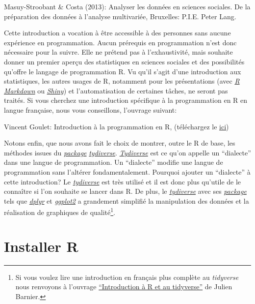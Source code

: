 \documentclass[
]{book}
\begin{document}
Masuy-Stroobant \& Costa (2013): Analyser les données en sciences sociales. De la préparation des données à l'analyse multivariée, Bruxelles: P.I.E. Peter Lang.

Cette introduction a vocation à être accessible à des personnes sans aucune expérience en programmation. Aucun prérequis en programmation n'est donc nécessaire pour la suivre. Elle ne prétend pas à l'exhaustivité, mais souhaite donner un premier aperçu des statistiques en sciences sociales et des possibilités qu'offre le langage de programmation R. Vu qu'il s'agit d'une introduction aux statistiques, les autres usages de R, notamment pour les présentations (avec \href{https://rmarkdown.rstudio.com/}{\emph{R Markdown}} ou \href{https://shiny.rstudio.com/}{\emph{Shiny}}) et l'automatisation de certaines tâches, ne seront pas traités. Si vous cherchez une introduction spécifique à la programmation en R en langue française, nous vous conseillons, l'ouvrage suivant:

Vincent Goulet: Introduction à la programmation en R, (téléchargez le \href{https://cran.r-project.org/doc/contrib/Goulet_introduction_programmation_R.pdf}{ici})

Notons enfin, que nous avons fait le choix de montrer, outre le R de base, les méthodes issues du \protect\hyperlink{packages}{\emph{package}} \href{https://www.tidyverse.org/}{\emph{tydiverse}}. \href{https://www.tidyverse.org/}{\emph{Tydiverse}} est ce qu'on appelle un ``dialecte'' dans une langue de programmation. Un ``dialecte'' modifie une langue de programmation sans l'altérer fondamentalement. Pourquoi ajouter un ``dialecte'' à cette introduction? Le \href{https://www.tidyverse.org/}{\emph{tydiverse}} est très utilisé et il est donc plus qu'utile de le connaître si l'on souhaite se lancer dans R. De plus, le \href{https://www.tidyverse.org/}{\emph{tydiverse}} avec ses \protect\hyperlink{packages}{\emph{package}} tels que \href{https://dplyr.tidyverse.org/}{\emph{dplyr}} et \href{https://ggplot2.tidyverse.org/}{\emph{ggplot2}} a grandement simplifié la manipulation des données et la réalisation de graphiques de qualité\footnote{Si vous voulez lire une introduction en français plus complète au \emph{tidyverse} nous renvoyons à l'ouvrage \href{https://juba.github.io/tidyverse/}{``Introduction à R et au tidyverse''} de Julien Barnier.}.

\hypertarget{installer-r}{%
\section{Installer R}\label{installer-r}}
\end{document}
